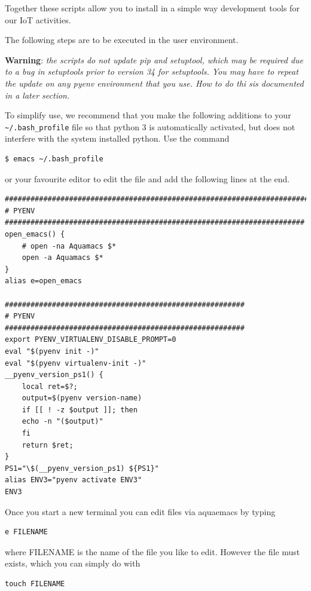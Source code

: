 Together these scripts allow you to install in a simple way development
tools for our IoT activities.

The following steps are to be executed in the user environment.

\textbf{Warning}: \emph{the scripts do not update pip and setuptool,
which may be required due to a bug in setuptools prior to version 34 for
setuptools. You may have to repeat the update on any pyenv environment
that you use. How to do thi sis documented in a later section.}

To simplify use, we recommend that you make the following additions to
your \texttt{\textasciitilde{}/.bash\_profile} file so that python 3 is
automatically activated, but does not interfere with the system
installed python. Use the command

\begin{verbatim}
$ emacs ~/.bash_profile
\end{verbatim}

or your favourite editor to edit the file and add the following lines at
the end.

\begin{verbatim}
####################################################################### 
# PYENV
######################################################################
open_emacs() {
    # open -na Aquamacs $*
    open -a Aquamacs $*    
}
alias e=open_emacs

########################################################
# PYENV
########################################################
export PYENV_VIRTUALENV_DISABLE_PROMPT=0
eval "$(pyenv init -)"
eval "$(pyenv virtualenv-init -)"
__pyenv_version_ps1() {
    local ret=$?;
    output=$(pyenv version-name)
    if [[ ! -z $output ]]; then
    echo -n "($output)"
    fi
    return $ret;
}
PS1="\$(__pyenv_version_ps1) ${PS1}"   
alias ENV3="pyenv activate ENV3"
ENV3
\end{verbatim}

Once you start a new terminal you can edit files via aquaemacs by typing

\begin{verbatim}
e FILENAME
\end{verbatim}

where FILENAME is the name of the file you like to edit. However the
file must exists, which you can simply do with

\begin{verbatim}
touch FILENAME
\end{verbatim}

